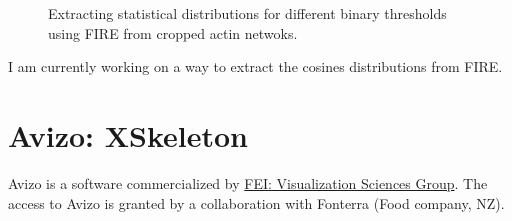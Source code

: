 \begin{figure}[h]
\begin{center}
\end{center}
\caption[Distributions of length and degree in FIRE]{Extracting statistical
distributions for different binary thresholds using FIRE from cropped
actin netwoks.}
\label{fig:fire_histograms}
\end{figure}

I am currently working on a way to extract the cosines distributions from
FIRE.

\section{Avizo: XSkeleton}
 Avizo is a software commercialized by
 \href{http://www.vsg3d.com/avizo/overview}{FEI: Visualization Sciences Group}.
The access to Avizo is granted by a collaboration with Fonterra (Food company,
NZ).

